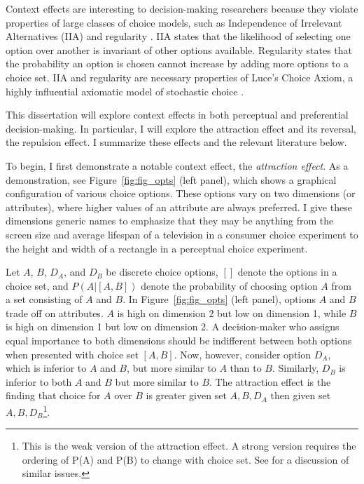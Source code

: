 Context effects are interesting to decision-making researchers because they violate properties of large classes of choice models, such as Independence of Irrelevant Alternatives (IIA) \parencite{ray1973independence} and regularity \parencite{mackay1995probabilistic,marley1989random}. IIA states that the likelihood of selecting one option over another is invariant of other options available. Regularity states that the probability an option is chosen cannot increase by adding more options to a choice set. IIA and regularity are necessary properties of Luce's Choice Axiom, a highly influential axiomatic model of stochastic choice \parencite{luceChoiceAxiomTwenty1977a, luce1959individual}. 

This dissertation will explore context effects in both perceptual and preferential decision-making. In particular, I will explore the attraction effect and its reversal, the repulsion effect. I summarize these effects and the relevant literature below.

To begin, I first demonstrate a notable context effect, the \textit{attraction effect}. As a demonstration, see Figure~\ref{fig:fig_opts} (left panel), which shows a graphical configuration of various choice options. These options vary on two dimensions (or attributes), where higher values of an attribute are always preferred. I give these dimensions generic names to emphasize that they may be anything from the screen size and average lifespan of a television in a consumer choice experiment to the height and width of a rectangle in a perceptual choice experiment.

Let $A$, $B$, $D_{A}$, and $D_{B}$ be discrete choice options, $[]$ denote the options in a choice set, and $P(A|[A,B])$ denote the probability of choosing option $A$ from a set consisting of $A$ and $B$. In Figure~\ref{fig:fig_opts} (left panel), options $A$ and $B$ trade off on attributes. $A$ is high on dimension 2 but low on dimension 1, while $B$ is high on dimension 1 but low on dimension 2. A decision-maker who assigns equal importance to both dimensions should be indifferent between both options when presented with choice set $[A,B]$. Now, however, consider option $D_{A}$, which is inferior to $A$ and $B$, but more similar to $A$ than to $B$. Similarly, $D_{B}$ is inferior to both $A$ and $B$ but more similar to $B$. The attraction effect is the finding that choice for $A$ over $B$ is greater given set ${A,B,D_{A}}$ then given set $A,B,D_{B}$\footnote{This is the weak version of the attraction effect. A strong version requires the ordering of P(A) and P(B) to change with choice set. See \textcite{davis2023illustrated} for a discussion of similar issues.}. 

